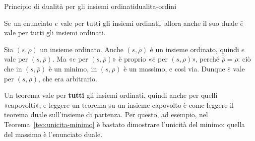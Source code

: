 \begin{concetto}
\begin{Teorema}{Principio di dualità per gli insiemi ordinati}{dualita-ordini}
    \begin{prerequisiti}
    \end{prerequisiti}
    Se un enunciato $e$ vale per tutti gli insiemi ordinati, allora anche il suo duale $\bar{e}$ vale per tutti gli insiemi ordinati.
\end{Teorema}
\begin{dimostrazione}
    Sia $(s, \rho)$ un insieme ordinato. Anche $(s, \bar{\rho})$ è un insieme ordinato, quindi $e$ vale per $(s, \bar{\rho})$. Ma «$e$ per $(s, \bar{\rho})$» è
    proprio «$\bar{e}$ per $(s, \rho)$», perché $\bar{\bar{\rho}} = \rho$: ciò che in $(s, \bar{\rho})$ è un minimo, in $(s, \rho)$ è un massimo, e così via.
    Dunque $\bar{e}$ vale per $(s, \rho)$, che era arbitrario.
\end{dimostrazione}
\end{concetto}

\begin{spiegazione}
    Un teorema vale per \textbf{tutti} gli insiemi ordinati, quindi anche per quelli «capovolti»; e leggere un teorema su un insieme
    capovolto è come leggere il teorema duale sull'insieme di partenza. Per questo, ad esempio, nel Teorema~\ref{teo:unicita-minimo}
    è bastato dimostrare l'unicità del minimo: quella del massimo è l'enunciato duale.
    \begin{center}
    \end{center}
\end{spiegazione}

